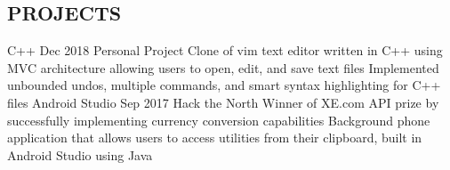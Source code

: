 \documentclass{aanguyen_res}
\begin{document}
\begin{main}
    \section{PROJECTS}
      \begin{entrylist}
        \rightentry%
          {C++}%
          {\href{https://github.com/bananabrick/vm}{}}%
          {Dec 2018}%
          {Personal Project}%
          {\createlist%
            {%
              Clone of vim text editor written in C++ using MVC architecture allowing users to open, %
              edit, and save text files%
            }%
            {%
               Implemented unbounded undos, multiple commands, and smart syntax highlighting for %
               C++ files %
            }%
          }
        \rightentry%
          {Android Studio}%
          {\href{https://github.com/kumailn/clipBuddy}{}}%
          {Sep 2017}%
          {Hack the North}%
          {\createlist%
            {%
              Winner of XE.com API prize by successfully implementing currency conversion %
              capabilities %
            }%
            {%
               Background phone application that allows users to access utilities from their clipboard, %
               built in Android Studio using Java%
            }%
          }
      \end{entrylist}
  \end{main}
\end{document}
